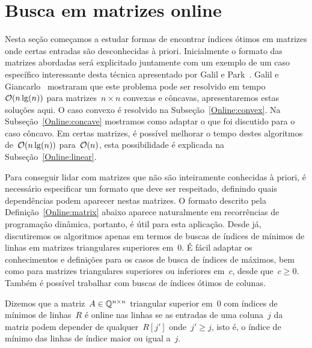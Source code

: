 \section{Busca em matrizes online}
\label{Online}

Nesta seção começamos a estudar formas de encontrar índices ótimos em matrizes onde certas entradas são desconhecidas à priori. Inicialmente o formato das matrizes abordadas será explicitado juntamente com um exemplo de um caso específico interessante desta técnica apresentado por Galil e Park~\cite{Galil:1992}. Galil e Giancarlo~\cite{Galil:1989} mostraram que este problema pode ser resolvido em tempo~$\mathcal{O}(n\lg(n))$ para matrizes~$n \times n$ convexas e côncavas, apresentaremos estas soluções aqui. O caso convexo é resolvido na Subseção~\ref{Online:convex}. Na Subseção~\ref{Online:concave} mostramos como adaptar o que foi discutido para o caso côncavo. Em certas matrizes, é possível melhorar o tempo destes algoritmos de~$\mathcal{O}(n\lg(n))$ para~$\mathcal{O}(n)$, esta possibilidade é explicada na Subseção~\ref{Online:linear}.

Para conseguir lidar com matrizes que não são inteiramente conhecidas à priori, é necessário especificar um formato que deve ser respeitado, definindo quais dependências podem aparecer nestas matrizes. O formato descrito pela Definição~\ref{Online:matrix} abaixo aparece naturalmente em recorrências de programação dinâmica, portanto, é útil para esta aplicação. Desde já, discutiremos os algoritmos apenas em termos de buscas de índices de mínimos de linhas em matrizes triangulares superiores em~0. É fácil adaptar os conhecimentos e definições para os casos de busca de índices de máximos, bem como para matrizes triangulares superiores ou inferiores em~$c$, desde que~$c \geq 0$. Também é possível trabalhar com buscas de índices ótimos de colunas.

\begin{defi} \label{Online:matrix}
Dizemos que a matriz~$A \in \mathbb{Q}^{n \times n}$ triangular superior em~0 com índices de mínimos de linhas~$R$ é online nas linhas se as entradas de uma coluna~$j$ da matriz podem depender de qualquer~$R[j']$ onde~$j' \geq j$, isto é, o índice de mínimo das linhas de índice maior ou igual a~$j$.
\end{defi}

